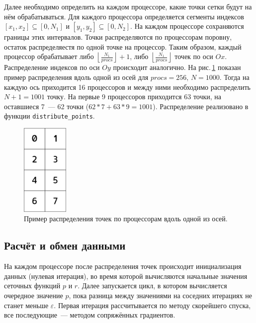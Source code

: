 \documentclass[11pt]{article}
\numberwithin{equation}{section}
\theoremstyle{plain}
\theoremstyle{definition}
\begin{document}
Далее необходимо определить на каждом процессоре, какие точки сетки будут на
нём обрабатываться. Для каждого процессора определяется сегменты индексов
$[x_1, x_2] \subseteq [0, N_1]$ и $[y_1, y_2] \subseteq [0, N_2]$.
На каждом процессоре сохраняются границы этих интервалов.
Точки распределяются по процессорам поровну, остаток распределяестя по
одной точке на процессор. Таким образом, каждый процессор
обрабатывает
либо $\left \lfloor \frac{N_1}{procs} \right \rfloor + 1$, либо
$\left \lfloor \frac{N_1}{procs} \right \rfloor$ точек по оси $Ox$.
Распределение индексов по оси $Oy$ происходит аналогично.
На рис.\,\ref{distr_points} показан пример распределения вдоль одной из
осей для $procs = 256$, $N = 1000$. Тогда на каждую ось приходится 16 процессоров
и между ними необходимо распределить $N + 1 = 1001$ точку. На первые 9
процессоров приходится 63 точки, на оставшиеся 7~--- 62 точки ($62*7 + 63*9 = 1001$).
Распределение реализовано в функции \verb|distribute_points|.

\begin{figure}[ht]
    \centering
    \includegraphics[width=0.2\textwidth]{proc_distr.png}
    \caption{Пример распределения точек по процессорам вдоль одной из осей.}
    \label{distr_points}
\end{figure}

\subsection{Расчёт и обмен данными}

На каждом процессоре после распределения точек происходит инициализация
данных (нулевая итерация), во время которой вычисляются начальные значения
сеточных функций $p$ и $r$. Далее запускается цикл, в котором вычисляется
очередное значение $p$, пока разница между значениями на соседних итерациях
не станет меньше $\varepsilon$. Первая итерация рассчитывается по методу
скорейшего спуска, все последующие~--- методом сопряжённых градиентов.
\end{document}
